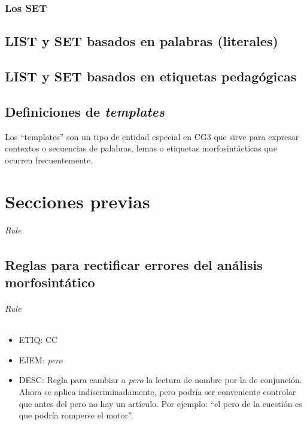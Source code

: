 \documentclass[11pt]{report}
\begin{document}
\section{Los SET}
\chapter{LIST y SET basados en palabras (literales)}
\chapter{LIST y SET basados en etiquetas pedagógicas}
\chapter{Definiciones de \emph{templates}}
Los ``templates'' son un tipo de entidad especial en CG3 que sirve para expresar contextos o secuencias de palabras, lemas o etiquetas morfosintácticas que ocurren frecuentemente. 

\part{Secciones previas}
\paragraph*{Rule}
\chapter{Reglas para rectificar errores del análisis morfosintático}
\paragraph*{Rule}
\begin{itemize}
\item ETIQ: CC
\item EJEM: \emph{pero} 
\item DESC: Regla para cambiar a \emph{pero} la lectura de nombre por la de conjunción. Ahora se aplica indiscriminadamente, pero podría ser conveniente controlar que antes del pero no hay un artículo. Por ejemplo: ``el pero de la cuestión es que podría romperse el motor''.
\end{itemize}
\end{document}
